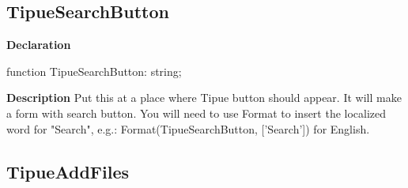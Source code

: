 \documentclass{report}
\newif\ifpdf
\begin{document}
\subsection*{TipueSearchButton}
\fi
\label{PasDoc_Tipue-TipueSearchButton}
\begin{list}{}{
\setlength{\itemindent}{0cm}
\setlength{\listparindent}{0cm}
\setlength{\leftmargin}{\evensidemargin}
\addtolength{\leftmargin}{\tmplength}
\settowidth{\labelsep}{X}
\addtolength{\leftmargin}{\labelsep}
\setlength{\labelwidth}{\tmplength}
}
\item[\textbf{Declaration}\hfill]
\ifpdf
\begin{flushleft}
\fi
\begin{ttfamily}
function TipueSearchButton: string;\end{ttfamily}

\ifpdf
\end{flushleft}
\fi

\par
\item[\textbf{Description}]
Put this at a place where Tipue button should appear. It will make a form with search button. You will need to use Format to insert the localized word for "Search", e.g.: Format(TipueSearchButton, ['Search']) for English.

\end{list}
\ifpdf
\subsection*{\large{\textbf{TipueAddFiles}}\normalsize\hspace{1ex}\hrulefill}
\else
\end{document}
